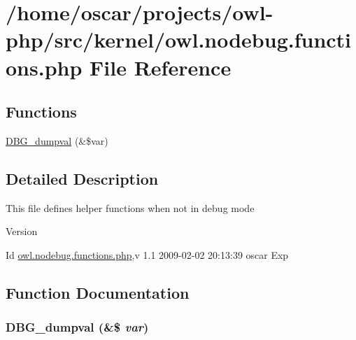\section{/home/oscar/projects/owl-\/php/src/kernel/owl.nodebug.functions.php File Reference}
\label{owl_8nodebug_8functions_8php}
\subsection*{Functions}
\begin{DoxyCompactItemize}
\item 
\hyperlink{owl_8nodebug_8functions_8php_a65a2d146de0c2b3a89eb4c118a88905f}{DBG\_\-dumpval} (\&\$var)
\end{DoxyCompactItemize}


\subsection{Detailed Description}
This file defines helper functions when not in debug mode \begin{DoxyVersion}{Version}

\end{DoxyVersion}
\begin{DoxyParagraph}{Id}
\hyperlink{owl_8nodebug_8functions_8php}{owl.nodebug.functions.php},v 1.1 2009-\/02-\/02 20:13:39 oscar Exp 
\end{DoxyParagraph}


\subsection{Function Documentation}
\subsubsection[{DBG\_\-dumpval}]{\setlength{\rightskip}{0pt plus 5cm}DBG\_\-dumpval (\&\$ {\em var})}\label{owl_8nodebug_8functions_8php_a65a2d146de0c2b3a89eb4c118a88905f}
